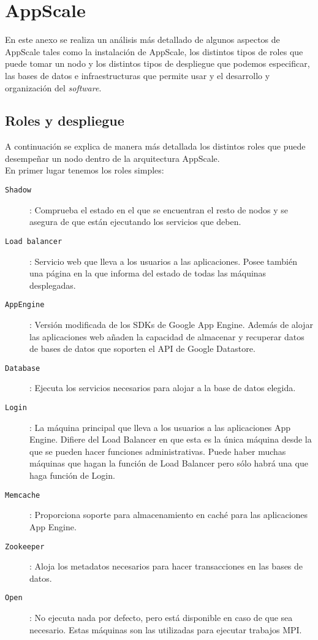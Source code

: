\chapter{AppScale}
\label{anx:appscale}


En este anexo se realiza un análisis más detallado de algunos aspectos de AppScale tales como la instalación de AppScale, los distintos tipos de roles que puede tomar un nodo y los distintos tipos de despliegue que podemos especificar, las bases de datos e infraestructuras que permite usar y el desarrollo y organización del \emph{software}.


\section{Roles y despliegue}
\label{anx:appscale-roles}

A continuación se explica de manera más detallada los distintos roles que puede desempeñar un nodo dentro de la arquitectura AppScale. \\

En primer lugar tenemos los roles simples:

\begin{description}
\item[\texttt{Shadow}]: Comprueba el estado en el que se encuentran el resto de nodos y se asegura de que están ejecutando los servicios que deben.
\item[\texttt{Load balancer}]: Servicio web que lleva a los usuarios a las aplicaciones. Posee también una página en la que informa del estado de todas las máquinas desplegadas.
\item[\texttt{AppEngine}]: Versión modificada de los SDKs de Google App Engine. Además de alojar las aplicaciones web añaden la capacidad de almacenar y recuperar datos de bases de datos que soporten el API de Google Datastore.
\item[\texttt{Database}]: Ejecuta los servicios necesarios para alojar a la base de datos elegida.
\item[\texttt{Login}]: La máquina principal que lleva a los usuarios a las aplicaciones App Engine. Difiere del Load Balancer en que esta es la única máquina desde la que se pueden hacer funciones administrativas. Puede haber muchas máquinas que hagan la función de Load Balancer pero sólo habrá una que haga función de Login.
\item[\texttt{Memcache}]: Proporciona soporte para almacenamiento en caché para las aplicaciones App Engine.
\item[\texttt{Zookeeper}]: Aloja los metadatos necesarios para hacer transacciones en las bases de datos.
\item[\texttt{Open}]: No ejecuta nada por defecto, pero está disponible en caso de que sea necesario. Estas máquinas son las utilizadas para ejecutar trabajos MPI.
\end{description}

